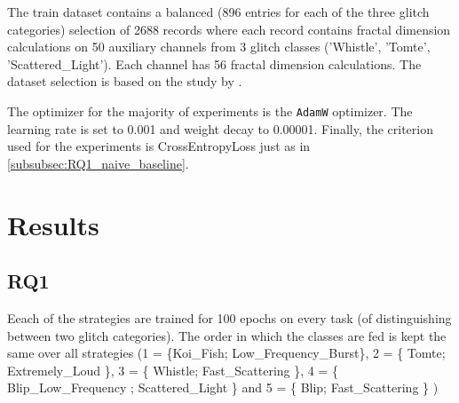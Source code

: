 The train dataset contains a balanced (896 entries for each of the three glitch categories) selection of 2688 records where each record contains fractal dimension calculations on 50 auxiliary channels from 3 glitch classes ('Whistle', 'Tomte', 'Scattered\_Light'). Each channel has 56 fractal dimension calculations. The dataset selection is based on the study by \citep{laguarta2023detection}.

The optimizer for the majority of experiments is the \verb|AdamW| optimizer. The learning rate is set to 0.001 and weight decay to 0.00001. Finally, the criterion used for the experiments is CrossEntropyLoss just as in \ref{subsubsec:RQ1_naive_baseline}. 
\newpage
\section{Results}
\subsection{RQ1}
\label{subsec:RQ1}
Eeach of the strategies are trained for 100 epochs on every task (of distinguishing between two glitch categories). The order in which the classes are fed is kept the same over all strategies (1 = \{Koi\_Fish; Low\_Frequency\_Burst\}, 2 = \{ Tomte; Extremely\_Loud \}, 3 = \{ Whistle; Fast\_Scattering \}, 4 = \{ Blip\_Low\_Frequency ; Scattered\_Light \} and 5 = \{ Blip; Fast\_Scattering \} )

